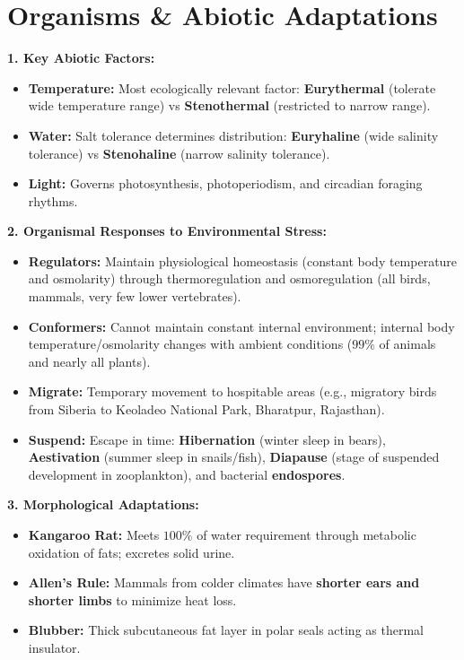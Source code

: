 \documentclass[10pt,twoside,openright]{book}
\begin{document}
\section{Organisms \& Abiotic Adaptations}

\begin{conceptbox}
\textbf{1. Key Abiotic Factors:}
\begin{itemize}[leftmargin=*]
  \item \textbf{Temperature:} Most ecologically relevant factor: \textbf{Eurythermal} (tolerate wide temperature range) vs \textbf{Stenothermal} (restricted to narrow range).
  \item \textbf{Water:} Salt tolerance determines distribution: \textbf{Euryhaline} (wide salinity tolerance) vs \textbf{Stenohaline} (narrow salinity tolerance).
  \item \textbf{Light:} Governs photosynthesis, photoperiodism, and circadian foraging rhythms.
\end{itemize}

\textbf{2. Organismal Responses to Environmental Stress:}
\begin{itemize}
  \item \textbf{Regulators:} Maintain physiological homeostasis (constant body temperature and osmolarity) through thermoregulation and osmoregulation (all birds, mammals, very few lower vertebrates).
  \item \textbf{Conformers:} Cannot maintain constant internal environment; internal body temperature/osmolarity changes with ambient conditions ($99\%$ of animals and nearly all plants).
  \item \textbf{Migrate:} Temporary movement to hospitable areas (e.g., migratory birds from Siberia to Keoladeo National Park, Bharatpur, Rajasthan).
  \item \textbf{Suspend:} Escape in time: \textbf{Hibernation} (winter sleep in bears), \textbf{Aestivation} (summer sleep in snails/fish), \textbf{Diapause} (stage of suspended development in zooplankton), and bacterial \textbf{endospores}.
\end{itemize}

\textbf{3. Morphological Adaptations:}
\begin{itemize}
  \item \textbf{Kangaroo Rat:} Meets $100\%$ of water requirement through metabolic oxidation of fats; excretes solid urine.
  \item \textbf{Allen's Rule:} Mammals from colder climates have \textbf{shorter ears and shorter limbs} to minimize heat loss.
  \item \textbf{Blubber:} Thick subcutaneous fat layer in polar seals acting as thermal insulator.
\end{itemize}
\end{conceptbox}
\end{document}
